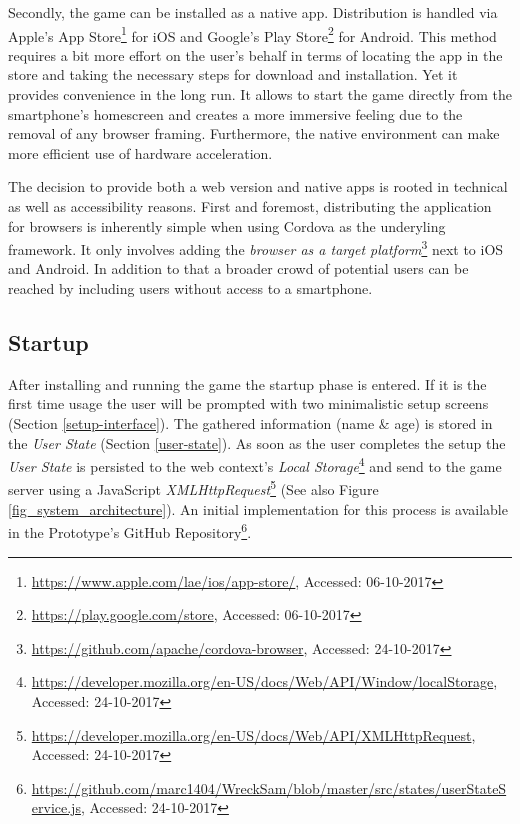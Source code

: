 Secondly, the game can be installed as a native app. Distribution is handled via Apple's App Store\footnote{\url{https://www.apple.com/lae/ios/app-store/}, Accessed: 06-10-2017} for iOS and Google's Play Store\footnote{\url{https://play.google.com/store}, Accessed: 06-10-2017} for Android. This method requires a bit more effort on the user's behalf in terms of locating the app in the store and taking the necessary steps for download and installation. Yet it provides convenience in the long run. It allows to start the game directly from the smartphone's homescreen and creates a more immersive feeling due to the removal of any browser framing. Furthermore, the native environment can make more efficient use of hardware acceleration.

The decision to provide both a web version and native apps is rooted in technical as well as accessibility reasons. First and foremost, distributing the application for browsers is inherently simple when using Cordova as the underyling framework. It only involves adding the \textit{browser as a target platform}\footnote{\url{https://github.com/apache/cordova-browser}, Accessed: 24-10-2017} next to iOS and Android. In addition to that a broader crowd of potential users can be reached by including users without access to a smartphone.

\subsection{Startup} \label{startup}
After installing and running the game the startup phase is entered. If it is the first time usage the user will be prompted with two minimalistic setup screens (Section \ref{setup-interface}). The gathered information (name \& age) is stored in the \textit{User State} (Section \ref{user-state}). As soon as the user completes the setup the \textit{User State} is persisted to the web context's \textit{Local Storage}\footnote{\url{https://developer.mozilla.org/en-US/docs/Web/API/Window/localStorage}, Accessed: 24-10-2017} and send to the game server using a JavaScript \textit{XMLHttpRequest}\footnote{\url{https://developer.mozilla.org/en-US/docs/Web/API/XMLHttpRequest}, Accessed: 24-10-2017} (See also Figure \ref{fig_system_architecture}). An initial implementation for this process is available in the Prototype's GitHub Repository\footnote{\url{https://github.com/marc1404/WreckSam/blob/master/src/states/userStateService.js}, Accessed: 24-10-2017}.

